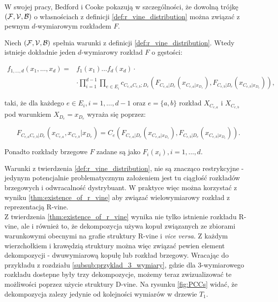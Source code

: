 W swojej pracy, Bedford i Cooke pokazują w szczególności, że dowolną trójkę $(\mathcal{F}, \mathcal{V}, \mathcal{B})$ o własnościach z definicji \ref{def:r_vine_distribution} można związać z pewnym $d$-wymiarowym rozkładem $F$.

\begin{thm}
	Niech $(\mathcal{F}, \mathcal{V}, \mathcal{B})$ spełnia warunki z definicji \ref{def:r_vine_distribution}. Wtedy istnieje dokładnie jeden $d$-wymiarowy rozkład $F$ o gęstości:
	
	\begin{equation*}
		\begin{split}
			f_{1, \dots, d}(x_1, \dots, x_d) = &f_1(x_1)\dots f_d(x_d) \cdot\\
			& \cdot \prod_{i=1}^{d-1}\prod_{e\in E_i}c_{C_{e, a}C_{e, b};D_e}(F_{C_{e, a}\vert D_e}(x_{C_{e, a}|x_{D_e}}), F_{C_{e, b}\vert D_e}(x_{C_{e, b}|x_{D_e}})),
		\end{split}
	\end{equation*}

	taki, że dla każdego $e\in E_i, i = 1,\dots, d-1$ oraz $e=\{a, b\}$ rozkład $X_{C_{e, a}}$ i $X_{C_{e,b}}$ pod warunkiem $X_{D_e} = x_{D_e}$ wyraża się poprzez:
	
	$$ F_{C_{e, a}C_{e, b}\vert D_e}(x_{C_{e, a}}, x_{C_{e, b}}|x_{D_e}) = C_{e}(F_{C_{e, a}\vert D_e}(x_{C_{e, a}|x_{D_e}}), F_{C_{e, b}\vert D_e}(x_{C_{e, b}|x_{D_e}})).$$
	
	Ponadto rozkłady brzegowe $F$ zadane są jako $F_i(x_i), i = 1,\dots, d.$
	\label{thm:existence_of_r_vine}
\end{thm}

Warunki z twierdzenia \ref{def:r_vine_distribution}, nie są znacząco restrykcyjne - jedynym potencjalnie problematycznym założeniem jest tu ciągłość rozkładów brzegowych i odwracalność dystrybuant. W praktyce więc można korzystać z wyniku \ref{thm:existence_of_r_vine} aby związać wielowymiarowy rozkład z reprezentacją R-vine.\\
Z twierdzenia \ref{thm:existence_of_r_vine} wynika nie tylko istnienie rozkładu R-vine, ale i również to, że dekompozycja używa kopuł związanych ze zbiorami warunkowymi obecnymi na grafie struktury R-vine i \emph{vice versa}. Z każdym wierzchołkiem i krawędzią struktury można więc związać pewien element dekompozycji - dwuwymiarową kopułę lub rozkład brzegowy. Wracając do przykładu z rozdziału \ref{subsub:przyklad_3_wymiary}, gdzie dla 3-wymiarowego rozkładu dostepne były trzy dekompozycje, możemy teraz zwizualizować te możliwości poprzez użycie struktury D-vine. Na rysunku \ref{fig:PCCs} widać, że dekompozycja zalezy jedynie od kolejności wymiarów w drzewie $T_1$.

